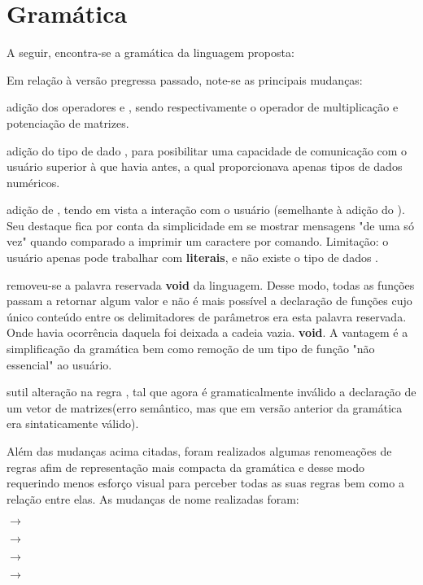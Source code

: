 \documentclass[
	article,			%
	11pt,				%
	oneside,			%
	a4paper,			%
	english,			%
	brazil,				%
	sumario=tradicional
	]{abntex2}
\begin{document}
\section{Gramática}
A seguir, encontra-se a gramática da linguagem proposta:
	
Em relação à versão pregressa passado, note-se as principais mudanças:
\begin{itemize}{
	\item adição dos operadores  e , sendo respectivamente o operador de multiplicação e potenciação de matrizes.
	\item adição do tipo de dado , para posibilitar uma capacidade de comunicação com o usuário superior à que havia antes, a qual proporcionava apenas tipos de dados numéricos.
	\item adição de , tendo em vista a interação com o usuário (semelhante à adição do ). Seu destaque fica por conta da simplicidade em se mostrar mensagens "de uma só vez" quando comparado a imprimir um caractere por comando. Limitação: o usuário apenas pode trabalhar com  \textbf{literais}, e não existe o tipo de dados .
	\item removeu-se a palavra reservada \textbf{void} da linguagem. Desse modo, todas as funções passam a retornar algum valor e não é mais possível a declaração de funções cujo único conteúdo entre os delimitadores de parâmetros era esta palavra reservada. Onde havia ocorrência daquela foi deixada a cadeia vazia.
	\textbf{void}. A vantagem é a simplificação da gramática bem como remoção de um tipo de função "não essencial" ao usuário.
	\item sutil alteração na regra , tal que agora é gramaticalmente inválido a declaração de um vetor de matrizes(erro semântico, mas que em versão anterior da gramática era sintaticamente válido).
	\item Além das mudanças acima citadas, foram realizados algumas renomeações de regras afim de representação mais compacta da gramática e desse modo requerindo menos esforço visual para perceber todas as suas regras bem como a relação entre elas. As mudanças de nome realizadas foram:
		\begin{itemize} {
			\item {} $\rightarrow$ 
			\item {} $\rightarrow$ 
			\item {} $\rightarrow$ 
			\item {} $\rightarrow$ 
}
\end{itemize}}
\end{itemize}
\end{document}
